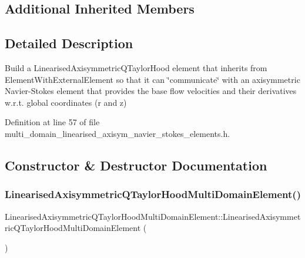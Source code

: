 \subsection*{Additional Inherited Members}


\subsection{Detailed Description}
Build a Linearised\+Axisymmetric\+Q\+Taylor\+Hood element that inherits from Element\+With\+External\+Element so that it can \char`\"{}communicate\char`\"{} with an axisymmetric Navier-\/\+Stokes element that provides the base flow velocities and their derivatives w.\+r.\+t. global coordinates (r and z) 

Definition at line 57 of file multi\+\_\+domain\+\_\+linearised\+\_\+axisym\+\_\+navier\+\_\+stokes\+\_\+elements.\+h.



\subsection{Constructor \& Destructor Documentation}
\mbox{\label{classLinearisedAxisymmetricQTaylorHoodMultiDomainElement_a8701f82f9da337ea29066af244c8922f}} 
\subsubsection{\texorpdfstring{Linearised\+Axisymmetric\+Q\+Taylor\+Hood\+Multi\+Domain\+Element()}{LinearisedAxisymmetricQTaylorHoodMultiDomainElement()}}
{\footnotesize\ttfamily Linearised\+Axisymmetric\+Q\+Taylor\+Hood\+Multi\+Domain\+Element\+::\+Linearised\+Axisymmetric\+Q\+Taylor\+Hood\+Multi\+Domain\+Element (\begin{DoxyParamCaption}{ }\end{DoxyParamCaption})\hspace{0.3cm}{\ttfamily [inline]}}



